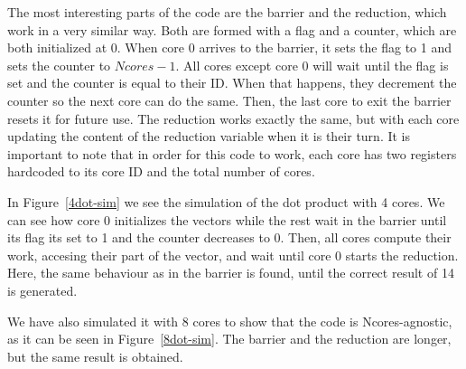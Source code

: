 The most interesting parts of the code are the barrier and the reduction, which work in a very similar way.
Both are formed with a flag and a counter, which are both initialized at 0.
When core 0 arrives to the barrier, it sets the flag to 1 and sets the counter to $Ncores - 1$.
All cores except core 0 will wait until the flag is set and the counter is equal to their ID.
When that happens, they decrement the counter so the next core can do the same.
Then, the last core to exit the barrier resets it for future use.
The reduction works exactly the same, but with each core updating the content of the reduction variable when it is their turn. 
It is important to note that in order for this code to work, each core has two registers hardcoded to its core ID and the total number of cores.


In Figure~\ref{4dot-sim} we see the simulation of the dot product with 4 cores.
We can see how core 0 initializes the vectors while the rest wait in the barrier until its flag its set to 1 and the counter decreases to 0.
Then, all cores compute their work, accesing their part of the vector, and wait until core 0 starts the reduction.
Here, the same behaviour as in the barrier is found, until the correct result of 14 is generated.

\label{4dot-sim}

We have also simulated it with 8 cores to show that the code is Ncores-agnostic, as it can be seen in Figure~\ref{8dot-sim}.
The barrier and the reduction are longer, but the same result is obtained.

\label{8dot-sim}










